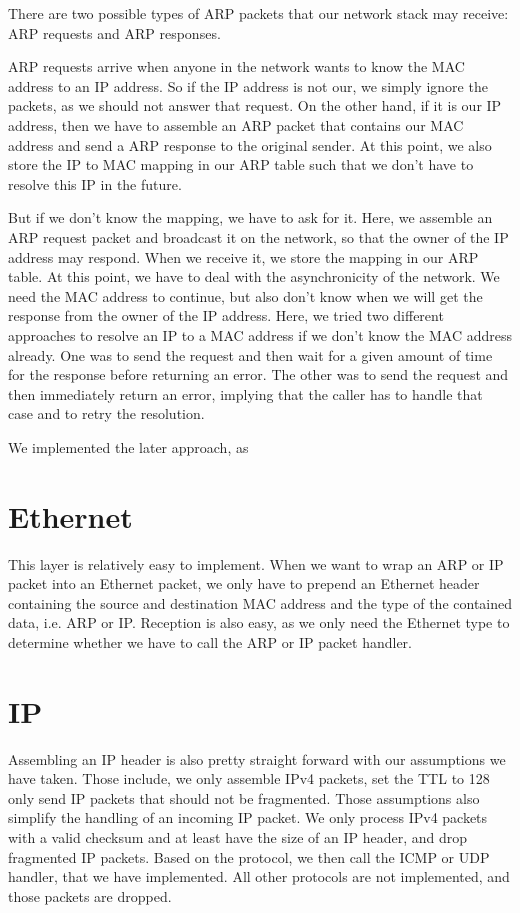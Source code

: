 There are two possible types of ARP packets that our network stack may receive:
ARP requests and ARP responses. 

ARP requests arrive when anyone in the network wants to know the MAC address to
an IP address. So if the IP address is not our, we simply ignore the packets, as
we should not answer that request. On the other hand, if it is our IP address,
then we have to assemble an ARP packet that contains our MAC address and send a
ARP response to the original sender. At this point, we also store the IP to MAC
mapping in our ARP table such that we don't have to resolve this IP in the
future.

But if we don't know the mapping, we have to ask for it. Here, we assemble an
ARP request packet and broadcast it on the network, so that the owner of the IP
address may respond. When we receive it, we store the mapping in our ARP table.
At this point, we have to deal with the asynchronicity of the network. We need
the MAC address to continue, but also don't know when we will get the response
from the owner of the IP address.  Here, we tried two different approaches to
resolve an IP to a MAC address if we don't know the MAC address already. One was
to send the request and then wait for a given amount of time for the response
before returning an error. The other was to send the request and then
immediately return an error, implying that the caller has to handle that case
and to retry the resolution. 

We implemented the later approach, as %

\section{Ethernet}

This layer is relatively easy to implement. When we want to wrap an ARP or IP
packet into an Ethernet packet, we only have to prepend an Ethernet header
containing the source and destination MAC address and the type of the contained
data, i.e. ARP or IP.  Reception is also easy, as we only need the Ethernet type
to determine whether we have to call the ARP or IP packet handler.

\section{IP}

Assembling an IP header is also pretty straight forward with our assumptions we
have taken. Those include, we only assemble IPv4 packets, set the TTL to 128
only send IP packets that should not be fragmented.  Those assumptions also
simplify the handling of an incoming IP packet. We only process IPv4 packets
with a valid checksum and at least have the size of an IP header, and drop
fragmented IP packets. Based on the protocol, we then call the ICMP or UDP
handler, that we have implemented. All other protocols are not implemented, and
those packets are dropped.

